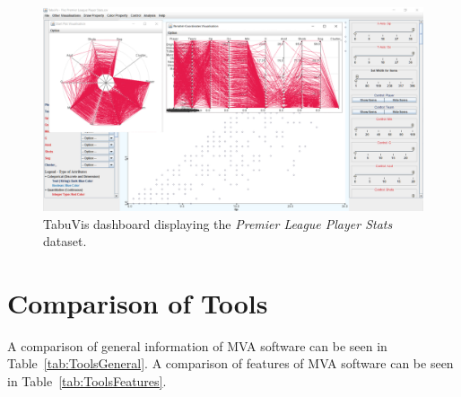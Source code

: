 \begin{figure}[tp]
\centering
\includegraphics[keepaspectratio,width=\linewidth,height=\halfh]
{images/screenshot-tabuvis.png}

\caption[TabuVis Dashboard Screenshot]
{%
TabuVis dashboard displaying the \emph{Premier League Player Stats} dataset.
}
\label{fig:ScreenshotTabuVis}
\end{figure}




\section{Comparison of Tools}

A comparison of general information of MVA software can be seen in
Table~\ref{tab:ToolsGeneral}. A comparison of features of MVA
software can be seen in Table~\ref{tab:ToolsFeatures}.




